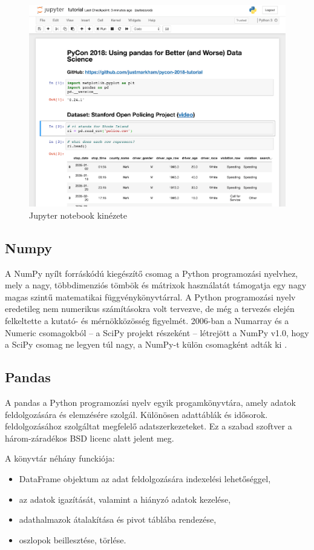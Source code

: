 \begin{figure}[h!]
    \centering
    \includegraphics[scale=0.6]{images/2.fejezet/jupyter_notebook.png}
    \caption{Jupyter notebook kinézete}
    \label{fig:jupyter}
\end{figure}

\subsection{Numpy}
A NumPy nyílt forráskódú kiegészítő csomag a Python programozási nyelvhez, mely a nagy, többdimenziós tömbök és mátrixok használatát támogatja egy nagy magas szintű matematikai függvénykönyvtárral. A Python programozási nyelv eredetileg nem numerikus számításokra volt tervezve, de még a tervezés elején felkeltette a kutató- és mérnökközösség figyelmét. 2006-ban a Numarray és a Numeric csomagokból – a SciPy projekt részeként – létrejött a NumPy v1.0, hogy a SciPy csomag ne legyen túl nagy, a NumPy-t külön csomagként adták ki \cite{numpy}.

\subsection{Pandas}
A pandas a Python programozási nyelv egyik progamkönyvtára, amely adatok feldolgozására és elemzésére szolgál. Különösen adattáblák és idősorok. feldolgozásához szolgáltat megfelelő adatszerkezeteket. Ez a szabad szoftver a három-záradékos BSD licenc alatt jelent meg.

A könyvtár néhány funckiója:
\begin{itemize}
    \item DataFrame objektum az adat feldolgozására indexelési lehetőséggel,
    \item az adatok igazítását, valamint a hiányzó adatok kezelése,
    \item adathalmazok átalakítása és pivot táblába rendezése,
    \item oszlopok beillesztése, törlése.
\end{itemize}

